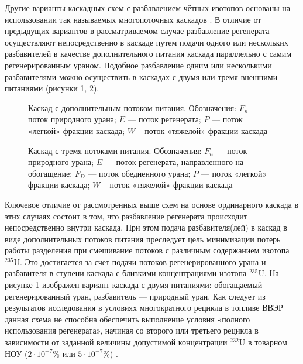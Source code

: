 Другие варианты каскадных схем с разбавлением чётных изотопов основаны на использовании так называемых многопоточных каскадов \cite{sulaberidzeQuasiidealCascadesAdditional2006}. В отличие от предыдущих вариантов в рассматриваемом случае разбавление регенерата осуществляют непосредственно в каскаде путем подачи одного или нескольких разбавителей в качестве дополнительного питания каскада параллельно с самим регенерированным ураном. Подобное разбавление одним или несколькими разбавителями можно осуществить в каскадах с двумя или тремя внешними питаниями (рисунки \ref{fig:2_inputs}, \ref{fig:3_inputs}).

\begin{figure}[ht]
  \caption{Каскад с дополнительным потоком питания. Обозначения: $F_{n}$ --- поток природного урана; $E$ --- поток регенерата; $P$ --- поток «легкой» фракции каскада; $W$ – поток «тяжелой» фракции каскада}\label{fig:2_inputs}
\end{figure}

\begin{figure}[ht]
  \caption{Каскад с тремя потоками питания. Обозначения: $F_{n}$ --- поток природного урана; $E$ --- поток регенерата, направленного на обогащение; $F_D$ --- поток обедненного урана; $P$ --- поток «легкой» фракции каскада; $W$ – поток «тяжелой» фракции каскада}\label{fig:3_inputs}
\end{figure}

Ключевое отличие от рассмотренных выше схем на основе ординарного каскада в этих случаях состоит в том, что разбавление регенерата происходит непосредственно внутри каскада. При этом подача разбавителя(лей) в каскад в виде дополнительных потоков питания преследует цель минимизации потерь работы разделения при смешивание потоков с различным содержанием изотопа $^{235}$U. Это достигается за счет подачи потоков регенерированного урана и разбавителя в ступени каскада с близкими концентрациями изотопа $^{235}$U.
На рисунке \ref{fig:2_inputs} изображен вариант каскада с двумя питаниями: обогащаемый регенерированный уран, разбавитель --- природный уран. Как следует из результатов исследования \cite{smirnovEvolutionIsotopicComposition2012} в условиях многократного рецикла в топливе ВВЭР данная схема не способна обеспечить выполнение условия «полного использования регенерата», начиная со второго или третьего рецикла в зависимости от заданной величины допустимой концентрации $^{232}$U в товарном НОУ ($2\cdot10^{-7}$\% или $5\cdot10^{-7}$\%) \cite{rodionovaAnalizTehnikoekonomicheskihHarakteristik2019a,smirnovFizikotehnicheskieProblemyObogashcheniya2020}.

